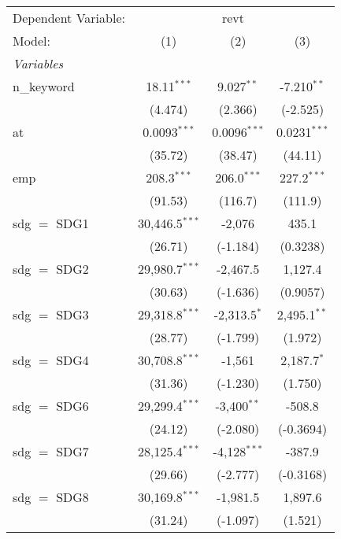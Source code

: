 
\begingroup
\centering
\begin{tabular}{lccc}
   \tabularnewline \midrule \midrule
   Dependent Variable: & \multicolumn{3}{c}{revt}\\
   Model:        & (1)              & (2)             & (3)\\  
   \midrule
   \emph{Variables}\\
   n\_keyword    & 18.11$^{***}$    & 9.027$^{**}$    & -7.210$^{**}$\\   
                 & (4.474)          & (2.366)         & (-2.525)\\   
   at            & 0.0093$^{***}$   & 0.0096$^{***}$  & 0.0231$^{***}$\\   
                 & (35.72)          & (38.47)         & (44.11)\\   
   emp           & 208.3$^{***}$    & 206.0$^{***}$   & 227.2$^{***}$\\   
                 & (91.53)          & (116.7)         & (111.9)\\   
   sdg $=$ SDG1  & 30,446.5$^{***}$ & -2,076          & 435.1\\   
                 & (26.71)          & (-1.184)        & (0.3238)\\   
   sdg $=$ SDG2  & 29,980.7$^{***}$ & -2,467.5        & 1,127.4\\   
                 & (30.63)          & (-1.636)        & (0.9057)\\   
   sdg $=$ SDG3  & 29,318.8$^{***}$ & -2,313.5$^{*}$  & 2,495.1$^{**}$\\   
                 & (28.77)          & (-1.799)        & (1.972)\\   
   sdg $=$ SDG4  & 30,708.8$^{***}$ & -1,561          & 2,187.7$^{*}$\\   
                 & (31.36)          & (-1.230)        & (1.750)\\   
   sdg $=$ SDG6  & 29,299.4$^{***}$ & -3,400$^{**}$   & -508.8\\   
                 & (24.12)          & (-2.080)        & (-0.3694)\\   
   sdg $=$ SDG7  & 28,125.4$^{***}$ & -4,128$^{***}$  & -387.9\\   
                 & (29.66)          & (-2.777)        & (-0.3168)\\   
   sdg $=$ SDG8  & 30,169.8$^{***}$ & -1,981.5        & 1,897.6\\   
                 & (31.24)          & (-1.097)        & (1.521)\\   

\end{tabular}
